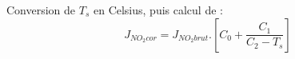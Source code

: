 Conversion de $T_s$ en \degre Celsius, puis calcul de :
\[
J_{NO_2cor} = J_{NO_2brut} . \left[ C_0 + \frac{C_1}{C_2-T_s}\right]
\]

